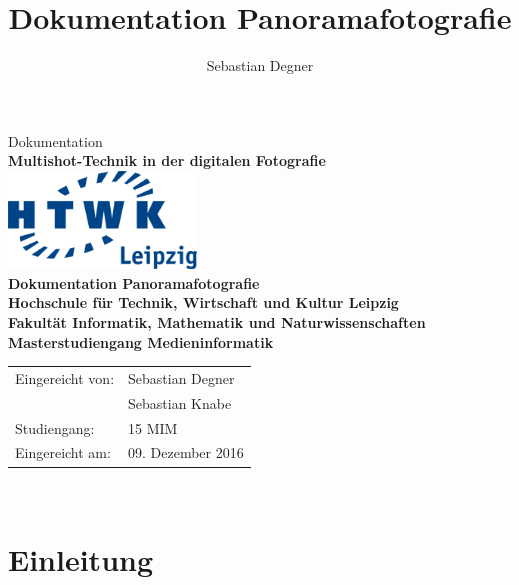 \documentclass[liststotoc,bibtotoc,fontsize=14pt,]{scrreprt}
\title{Dokumentation Panoramafotografie}
\author{Sebastian Degner}
\begin{document}
	
	\begin{titlepage}
		\begin{center}
			\vspace{2cm}
			Dokumentation\\ \textbf{ Multishot-Technik in der digitalen Fotografie}\\ 
			\vspace{2,5cm}
			\includegraphics[width=5cm]{HTWK_Logo_RGB-transparent_250.png}\\
			
			\vspace{2,5cm}
			\huge \textbf{\textsf{Dokumentation Panoramafotografie}} \\
			\vspace{3cm}
			\fontsize{15}{18} \textbf{Hochschule für Technik, Wirtschaft und Kultur
				Leipzig\\ Fakultät Informatik, Mathematik und Naturwissenschaften\\   Masterstudiengang Medieninformatik}\\
			\vspace{3cm}
		\end{center}
		\normalsize{
			\begin{tabular}{ll}
				Eingereicht von: & {Sebastian Degner} \\
				 & {Sebastian Knabe} \\
				Studiengang: & 15 MIM\\
				Eingereicht am: & 09. Dezember 2016 \\
			\end{tabular}\\
		}
		
	\end{titlepage}
	
	
	
	
	
	\tableofcontents
	\clearpage
	\listoffigures

	\chapter{Einleitung}
	\label{ch:einleitung}
		
\end{document}
